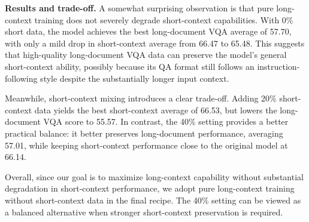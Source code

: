 \noindent\textbf{Results and trade-off.}
A somewhat surprising observation is that pure long-context training does not severely degrade short-context capabilities.
With 0\% short data, the model achieves the best long-document VQA average of 57.70, with only a mild drop in short-context average from 66.47 to 65.48.
This suggests that high-quality long-document VQA data can preserve the model's general short-context ability, possibly because its QA format still follows an instruction-following style despite the substantially longer input context.

Meanwhile, short-context mixing introduces a clear trade-off.
Adding 20\% short-context data yields the best short-context average of 66.53, but lowers the long-document VQA score to 55.57.
In contrast, the 40\% setting provides a better practical balance: it better preserves long-document performance, averaging 57.01, while keeping short-context performance close to the original model at 66.14.

Overall, since our goal is to maximize long-context capability without substantial degradation in short-context performance, we adopt pure long-context training without short-context data in the final recipe.
The 40\% setting can be viewed as a balanced alternative when stronger short-context preservation is required.
